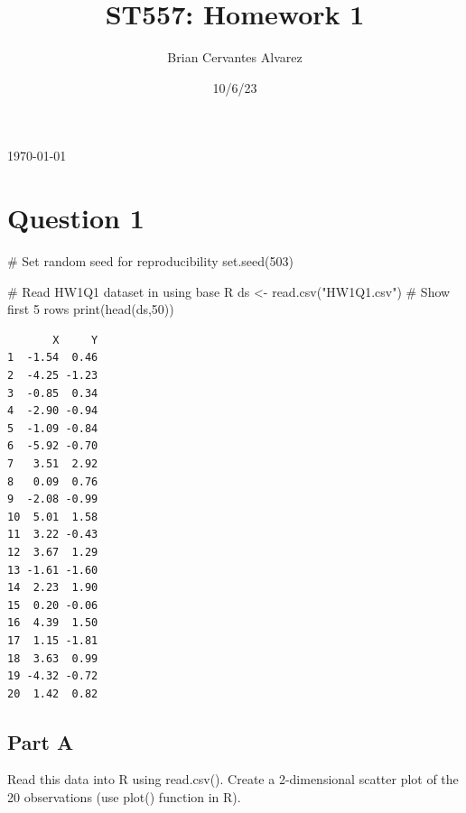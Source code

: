\documentclass[
  letterpaper,
  DIV=11,
  numbers=noendperiod]{scrartcl}
\title{ST557: Homework 1}
\author{Brian Cervantes Alvarez}
\date{10/6/23}
\makeatletter
\newenvironment{Shaded}{}{}
\newcommand{\CommentTok}[1]{\textcolor[rgb]{0.57,0.51,0.45}{#1}}
\newcommand{\DecValTok}[1]{\textcolor[rgb]{0.96,0.45,0.00}{#1}}
\newcommand{\FunctionTok}[1]{\textcolor[rgb]{0.41,0.62,0.42}{#1}}
\newcommand{\NormalTok}[1]{\textcolor[rgb]{0.24,0.22,0.21}{#1}}
\newcommand{\OtherTok}[1]{\textcolor[rgb]{0.41,0.62,0.42}{#1}}
\newcommand{\SpecialCharTok}[1]{\textcolor[rgb]{0.69,0.38,0.53}{#1}}
\newcommand{\StringTok}[1]{\textcolor[rgb]{0.60,0.59,0.10}{#1}}
\renewcommand{\maketitle}{\bgroup\setlength{\parindent}{0pt}
\begin{flushleft}
  {\sffamily\huge\textbf{\MakeUppercase{\@title}}} \vspace{0.3cm} \newline
  {\Large {\@subtitle}} \newline
  {\large\@author} \newline
  {\large\today} %
\end{flushleft}\egroup
}
\makeatother
\begin{document}
\maketitle
\pagestyle{mystyle}

\ifdefined\Shaded\renewenvironment{Shaded}{\begin{tcolorbox}[breakable, interior hidden, enhanced, boxrule=0pt, borderline west={3pt}{0pt}{shadecolor}, frame hidden, sharp corners]}{\end{tcolorbox}}\fi

\hypertarget{question-1}{%
\section{Question 1}\label{question-1}}

\begin{Shaded}
\begin{Highlighting}[]
\CommentTok{\# Set random seed for reproducibility}
\FunctionTok{set.seed}\NormalTok{(}\DecValTok{503}\NormalTok{)}

\CommentTok{\# Read HW1Q1 dataset in using base R}
\NormalTok{ds }\OtherTok{\textless{}{-}} \FunctionTok{read.csv}\NormalTok{(}\StringTok{"HW1Q1.csv"}\NormalTok{)}
\CommentTok{\# Show first 5 rows}
\FunctionTok{print}\NormalTok{(}\FunctionTok{head}\NormalTok{(ds,}\DecValTok{50}\NormalTok{))}
\end{Highlighting}
\end{Shaded}

\begin{verbatim}
       X     Y
1  -1.54  0.46
2  -4.25 -1.23
3  -0.85  0.34
4  -2.90 -0.94
5  -1.09 -0.84
6  -5.92 -0.70
7   3.51  2.92
8   0.09  0.76
9  -2.08 -0.99
10  5.01  1.58
11  3.22 -0.43
12  3.67  1.29
13 -1.61 -1.60
14  2.23  1.90
15  0.20 -0.06
16  4.39  1.50
17  1.15 -1.81
18  3.63  0.99
19 -4.32 -0.72
20  1.42  0.82
\end{verbatim}

\newpage{}

\hypertarget{part-a}{%
\subsection{Part A}\label{part-a}}

Read this data into R using read.csv(). Create a 2-dimensional scatter
plot of the 20 observations (use plot() function in R).

\begin{Shaded}
\end{Shaded}
\end{document}
